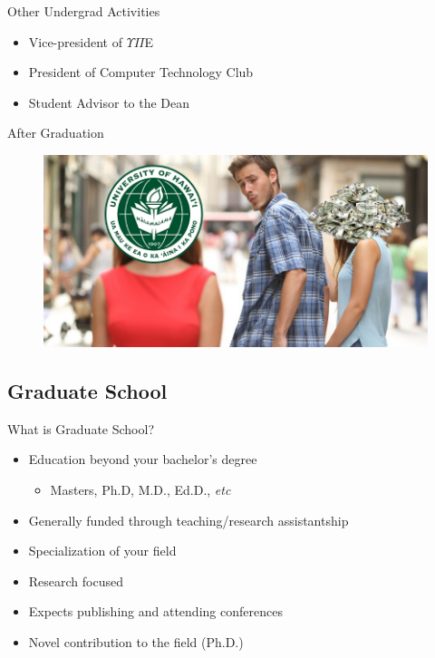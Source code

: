 \documentclass{beamer}
\begin{document}
\begin{frame}{Other Undergrad Activities}
\begin{itemize}
	\item Vice-president of $\Upsilon\Pi$E
	\item President of Computer Technology Club
	\item Student Advisor to the Dean
\end{itemize}
\end{frame}

\begin{frame}{After Graduation}
\begin{figure}
	\includegraphics[width=\linewidth]{img/uh.png}
\end{figure}
\end{frame}

\subsection{Graduate School}

\begin{frame}{What is Graduate School?}
\begin{itemize}
	\item Education beyond your bachelor's degree
	\begin{itemize}
		\item Masters, Ph.D, M.D., Ed.D., \emph{etc}
	\end{itemize}
	\item Generally funded through teaching/research assistantship
	\item Specialization of your field
	\item Research focused
	\item Expects publishing and attending conferences
	\item Novel contribution to the field (Ph.D.)
\end{itemize}
\end{frame}
\end{document}
